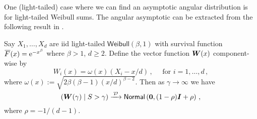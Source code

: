 One (light-tailed) case where we can find an asymptotic angular distribution is for light-tailed Weibull sums. The angular asymptotic can be extracted from the following result in \cite{asmussen2017tail}.

\begin{proposition} \label{prop:light_weibull_angles}
Say $X_1, \dots, X_d$ are iid light-tailed $\mathsf{Weibull}(\beta, 1)$ with survival function $\Ftail(x)=\e^{-x^\beta}$ where $\beta>1$, $d \ge 2$.
Define the vector function $\bm{W}(x)$ component-wise by
\[ W_i(x) = \omega(x) ( X_i - x/d) \,, \quad \text{ for } i=1,\dots,d\,, \]
where $\omega(x) := \sqrt{2  \beta (\beta-1) (x/d)^{\beta-2}}$.
Then as $\gamma \to \infty$ we have
\[ (\bm{W}(\gamma) \mid S > \gamma) \xrightarrow{\:\smash{\mathcal{D}}\:} \mathsf{Normal}\left(\bm{0}, (1 - \rho) \bm{I} + \rho \right) \,,\]
where $\rho = -1/(d-1)$.
\end{proposition}











